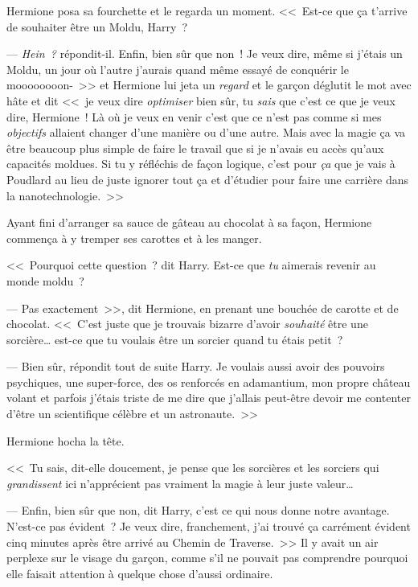 Hermione posa sa fourchette et le regarda un moment. <<~Est-ce que ça t'arrive de souhaiter être un Moldu, Harry~?

--- \emph{Hein~?} répondit-il. Enfin, bien sûr que non~! Je veux dire, même si j'étais un Moldu, un jour où l'autre j'aurais quand même essayé de conquérir le moooooooon-~>> et Hermione lui jeta un \emph{regard} et le garçon déglutit le mot avec hâte et dit <<~je veux dire \emph{optimiser} bien sûr, tu \emph{sais} que c'est ce que je veux dire, Hermione~! Là où je veux en venir c'est que ce n'est pas comme si mes \emph{objectifs} allaient changer d'une manière ou d'une autre. Mais avec la magie ça va être beaucoup plus simple de faire le travail que si je n'avais eu accès qu'aux capacités moldues. Si tu y réfléchis de façon logique, c'est pour \emph{ça} que je vais à Poudlard au lieu de juste ignorer tout ça et d'étudier pour faire une carrière dans la nanotechnologie.~>>

Ayant fini d'arranger sa sauce de gâteau au chocolat à sa façon, Hermione commença à y tremper ses carottes et à les manger.

<<~Pourquoi cette question~? dit Harry. Est-ce que \emph{tu} aimerais revenir au monde moldu~?

--- Pas exactement~>>, dit Hermione, en prenant une bouchée de carotte et de chocolat. <<~C'est juste que je trouvais bizarre d'avoir \emph{souhaité} être une sorcière… est-ce que tu voulais être un sorcier quand tu étais petit~?

--- Bien sûr, répondit tout de suite Harry. Je voulais aussi avoir des pouvoirs psychiques, une super-force, des os renforcés en adamantium, mon propre château volant et parfois j'étais triste de me dire que j'allais peut-être devoir me contenter d'être un scientifique célèbre et un astronaute.~>>

Hermione hocha la tête.

<<~Tu sais, dit-elle doucement, je pense que les sorcières et les sorciers qui \emph{grandissent} ici n'apprécient pas vraiment la magie à leur juste valeur…

--- Enfin, bien sûr que non, dit Harry, c'est ce qui nous donne notre avantage. N'est-ce pas évident~? Je veux dire, franchement, j'ai trouvé ça carrément évident cinq minutes après être arrivé au Chemin de Traverse.~>> Il y avait un air perplexe sur le visage du garçon, comme s'il ne pouvait pas comprendre pourquoi elle faisait attention à quelque chose d'aussi ordinaire.
